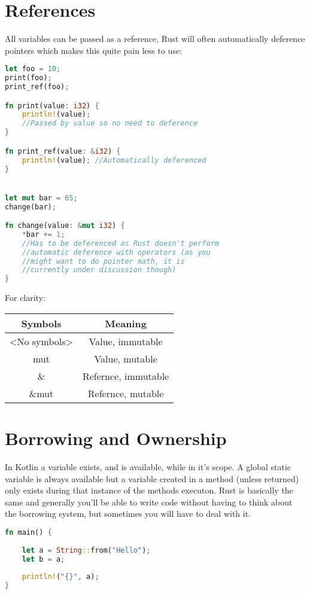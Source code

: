 \documentclass[a4paper,11pt]{article}
\begin{document}
\section{References}
All variables can be passed as a reference, Rust will often automatically deference pointers which makes this quite pain less to use:
\begin{lstlisting}[language=Rust,frame=single]
let foo = 10;
print(foo);
print_ref(foo);

fn print(value: i32) {
	println!(value); 
	//Passed by value so no need to deference
}

fn print_ref(value: &i32) {
	println!(value); //Automatically deferenced
}


let mut bar = 65;
change(bar);

fn change(value: &mut i32) {
	*bar += 1; 
	//Has to be deferenced as Rust doesn't perform 
	//automatic deference with operators (as you 
	//might want to do pointer math, it is
	//currently under discussion though)
} 

\end{lstlisting}

For clarity:
\begin{center}
\begin{tabular}{ |c|c| } 
 \hline
 Symbols & Meaning \\ 
 \hline
 <No symbols> & Value, immutable \\ 
 mut & Value, mutable \\ 
 \& & Refernce, immutable \\ 
 \&mut & Refernce, mutable \\ 
 \hline
\end{tabular}
\end{center}

\newpage
\section{Borrowing and Ownership}
In Kotlin a variable exists, and is available, while in it's scope. A global static variable is always available but a variable created in a method (unless returned) only exists during that instance of the methods executon. Rust is basically the same and generally you'll be able to write code without having to think about the borrowing system, but sometimes you will have to deal with it.
\begin{lstlisting}[language=Rust,frame=single]
fn main() {
    
    let a = String::from("Hello");
    let b = a;
    
    println!("{}", a);
}
\end{lstlisting}
\end{document}
